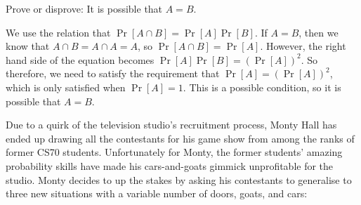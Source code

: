 \documentclass[11pt]{article}
\begin{document}
\begin{Parts}
\Part Prove or disprove: It is possible that $A=B$.

\begin{solution}
    We use the relation that $\Pr[A \cap B] = \Pr[A]\Pr[B]$. If $A = B$, then we know that $A \cap B = A \cap A = A$, so $\Pr[A \cap B] = \Pr[A]$. However, the right hand side of the equation becomes $\Pr[A]\Pr[B] = (\Pr[A])^2$. So therefore, we need to satisfy the requirement that $\Pr[A] = (\Pr[A])^2$, which is only satisfied when $\Pr[A] = 1$. This is a possible condition, so it is possible that $A = B$.
\end{solution}

\end{Parts}
\pagebreak
{}

Due to a quirk of the television studio's recruitment process, Monty Hall has
ended up drawing all the contestants for his game show from among the ranks of
former CS70 students. Unfortunately for Monty, the former students' amazing
probability skills have made his cars-and-goats gimmick unprofitable for the
studio. Monty decides to up the stakes by asking his contestants to generalise
to three new situations with a variable number of doors, goats, and cars:
\end{document}
